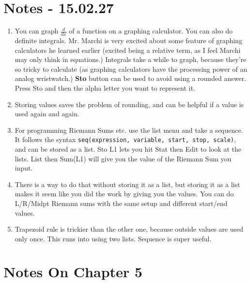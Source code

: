 \documentclass[11pt]{article}
\begin{document}
\section{Notes - 15.02.27}
\begin{enumerate}
	\item You can graph $\frac{d}{dx}$ of a function on a graphing calculator.  You can also do definite integrals.  Mr. Marchi is very excited about some feature of graphing calculators he learned earlier (excited being a relative term, as I feel Marchi may only think in equations.)  Integrals take a while to graph, because they're so tricky to calculate (as graphing calculators have the processing power of an analog wristwatch.) {\bf Sto} button can be used to avoid using a rounded answer.  Press Sto and then the alpha letter you want to represent it.
	\item Storing values saves the problem of rounding, and can be helpful if a value is used again and again.
	\item For programming Riemann Sums etc. use the list menu and take a sequence.  It follows the syntax \texttt{seq(expression, variable, start, stop, scale)}, and can be stored as a list. Sto L1 lets you hit Stat then Edit to look at the lists.  List then Sum(L1) will give you the value of the Riemann Sum you input.
	\item There is a way to do that without storing it as a list, but storing it as a list makes it seem like you did the work by giving you the values.  You can do L/R/Midpt Riemann sums with the same setup and different start/end values.
	\item Trapezoid rule is trickier than the other one, because outside values are used only once.  This runs into using two lists.  Sequence is super useful.
\end{enumerate}
\section{Notes On Chapter 5}
\end{document}
